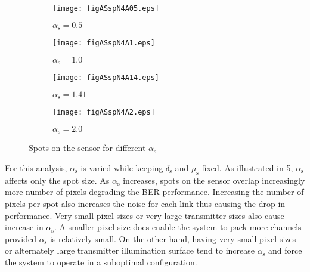 \begin{figure}[!t]
	\centering
		\begin{subfigure}{0.49\textwidth}
			\centering
			\texttt{[image: figASspN4A05.eps]}
			\label{figASspN4A05}
		\caption{$\alpha_{\text{s}}=0.5$}
		\end{subfigure}
		\hfill
		\begin{subfigure}{0.49\textwidth}
			\centering
			\texttt{[image: figASspN4A1.eps]}
			\label{figASspN4A1}
		\caption{$\alpha_{\text{s}}=1.0$}
		\end{subfigure}
		\vfill
		\begin{subfigure}{0.49\textwidth}
			\centering
			\texttt{[image: figASspN4A14.eps]}
			\label{figASspN4A14}
		\caption{$\alpha_{\text{s}}=1.41$}
		\end{subfigure}
		\hfill
		\begin{subfigure}{0.49\textwidth}
			\centering
			\texttt{[image: figASspN4A2.eps]}
			\label{figASspN4A2}
		\caption{$\alpha_{\text{s}}=2.0$}
		\end{subfigure}
	\caption{Spots on the sensor for different $\alpha_{\text{s}}$}
	\label{figASSpots}
\end{figure}


For this analysis, $\alpha_{\text{s}}$ is varied while keeping $\delta_{\text{s}}$ and $\mu_{\text{s}}$ fixed. As illustrated in \figurename{ \ref{figASSpots}}, $\alpha_{\text{s}}$ affects only the spot size. As $\alpha_{\text{s}}$ increases, spots on the sensor overlap increasingly more number of pixels degrading the BER performance. Increasing the number of pixels per spot also increases the noise for each link thus causing the drop in performance. Very small pixel sizes or very large transmitter sizes also cause increase in $\alpha_{\text{s}}$. A smaller pixel size does enable the system to pack more channels provided $\alpha_{\text{s}}$ is relatively small. On the other hand, having very small pixel sizes or alternately large transmitter illumination surface tend to increase $\alpha_{\text{s}}$ and force the system to operate in a suboptimal configuration.

